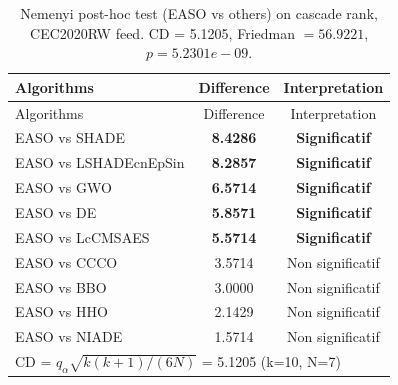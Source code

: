 \begin{center}
\small
\renewcommand{\arraystretch}{1.25}
\begin{longtable}{lcc}
\caption{Nemenyi post-hoc test (EASO vs others) on cascade rank, CEC2020RW  feed. CD = 5.1205, Friedman $=56.9221$, $p=5.2301e-09$.}
\label{tab:nemenyi_cascade_CEC2020RW_feed} \\
\toprule
Algorithms & Difference & Interpretation \\
\midrule
\endfirsthead
\toprule
Algorithms & Difference & Interpretation \\
\midrule
\endhead
EASO vs SHADE & \textbf{8.4286} & \textbf{Significatif} \\
EASO vs LSHADEcnEpSin & \textbf{8.2857} & \textbf{Significatif} \\
EASO vs GWO & \textbf{6.5714} & \textbf{Significatif} \\
EASO vs DE & \textbf{5.8571} & \textbf{Significatif} \\
EASO vs LcCMSAES & \textbf{5.5714} & \textbf{Significatif} \\
EASO vs CCCO & 3.5714 & Non significatif \\
EASO vs BBO & 3.0000 & Non significatif \\
EASO vs HHO & 2.1429 & Non significatif \\
EASO vs NIADE & 1.5714 & Non significatif \\
\midrule
\multicolumn{3}{l}{CD = $q_\alpha \sqrt{k(k+1)/(6N)}$ = 5.1205 (k=10, N=7)} \\
\bottomrule
\end{longtable}
\end{center}